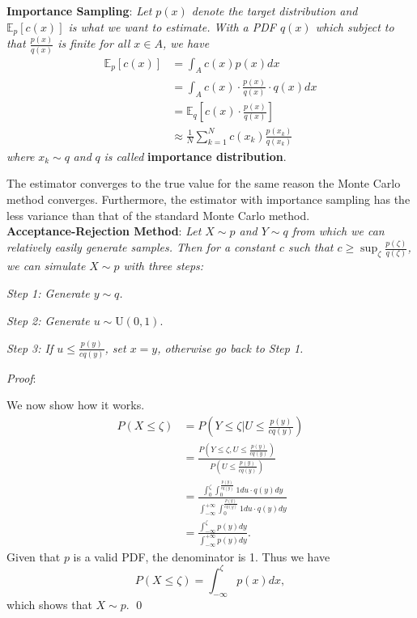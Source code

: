 \documentclass{progartcn}
\begin{document}
		\textbf{Importance Sampling}: \textit{Let $p(x)$ denote the target distribution and $\mathbb{E}_p[c(x)]$ is what we want to estimate. With a PDF $q(x)$ which subject to that $\frac{p(x)}{q(x)}$ is finite for all $x\in A$, we have}
		\[
		\begin{split}
		\mathbb{E}_p[c(x)]&=\int_A c(x)p(x)dx\\
		&=\int_A c(x)\cdot \frac{p(x)}{q(x)} \cdot q(x)dx\\
		&=\mathbb{E}_q\left[c(x)\cdot \frac{p(x)}{q(x)}\right]\\
		&\approx \frac{1}{N}\sum_{k=1}^N c(x_k)\frac{p(x_k)}{q(x_k)}
		\end{split}
		\label{eq_importance_sampling}
		\]
		\textit{where} $x_k\sim q$ \textit{and} $q$ \textit{is called} \textbf{importance distribution}.

		The estimator converges to the true value for the same reason the Monte Carlo method converges. Furthermore, the estimator with importance sampling has the less variance than that of the standard Monte Carlo method.\\

		\textbf{Acceptance-Rejection Method}: \textit{Let $X\sim p$ and $Y\sim q$ from which we can relatively easily generate samples. Then for a constant $c$ such that $c\ge \sup_\zeta \frac{p(\zeta)}{q(\zeta)}$, we can simulate $X\sim p$ with three steps:}

		\qquad \textit{Step 1: Generate $y\sim q$.}

		\qquad \textit{Step 2: Generate $u\sim$}$\text{U}(0,1)$.

		\qquad \textit{Step 3: If $u\le\frac{p(y)}{cq(y)}$, set $x=y$, otherwise go back to Step 1.}

		\textit{Proof}:

		We now show how it works.
		\[\begin{split}
		P(X\le \zeta)&=P\left(Y\le\zeta|U\le \frac{p(y)}{cq(y)}\right)\\
		&=\frac{P(Y\le \zeta, U\le \frac{p(y)}{cq(y)})}{P(U\le \frac{p(y)}{cq(y)})}\\
		&=\frac{\int_0^\zeta \int_0^{\frac{p(y)}{cq(y)}} 1du\cdot q(y)dy}{\int_{-\infty}^{+\infty}\int_0^{\frac{p(y)}{cq(y)}} 1du\cdot q(y)dy}\\
		&=\frac{\int_{-\infty}^\zeta p(y)dy}{\int_{-\infty}^{+\infty}p(y)dy}.
		\end{split}
		\]
		Given that $p$ is a valid PDF, the denominator is 1. Thus we have
		\[P(X\le\zeta)=\int_{-\infty}^\zeta p(x)dx,\]
		which shows that $X\sim p$.
		\qed\\
\end{document}
